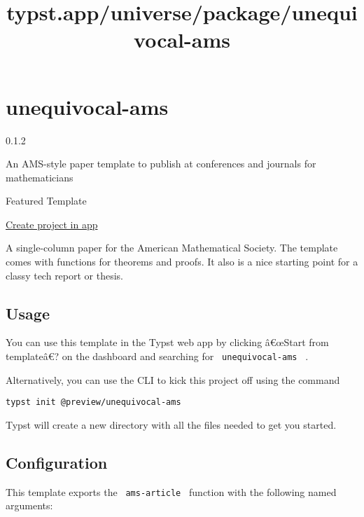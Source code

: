 \title{typst.app/universe/package/unequivocal-ams}

\label{banner}
\label{template-thumbnail}

\section{unequivocal-ams}\label{unequivocal-ams}

{ 0.1.2 }

An AMS-style paper template to publish at conferences and journals for
mathematicians

{ } Featured Template

\href{/app?template=unequivocal-ams&version=0.1.2}{Create project in
app}

\label{readme}
A single-column paper for the American Mathematical Society. The
template comes with functions for theorems and proofs. It also is a nice
starting point for a classy tech report or thesis.

\subsection{Usage}\label{usage}

You can use this template in the Typst web app by clicking â€œStart from
templateâ€? on the dashboard and searching for
\texttt{\ unequivocal-ams\ } .

Alternatively, you can use the CLI to kick this project off using the
command

\begin{verbatim}
typst init @preview/unequivocal-ams
\end{verbatim}

Typst will create a new directory with all the files needed to get you
started.

\subsection{Configuration}\label{configuration}

This template exports the \texttt{\ ams-article\ } function with the
following named arguments:

